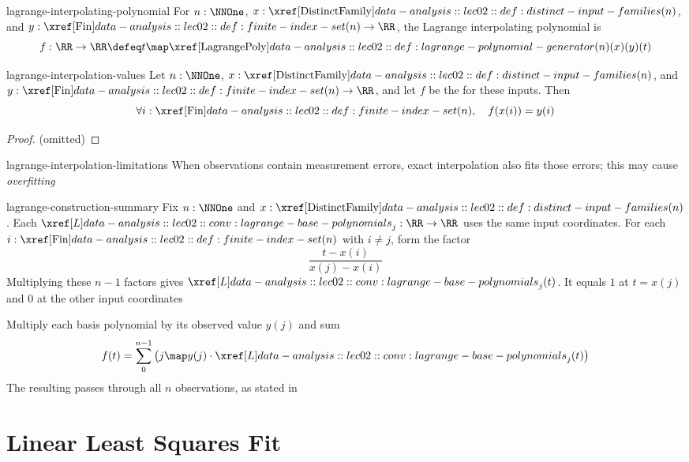 \documentclass[12pt]{article}
\numberwithin{figure}{section}
\begin{document}
\begin{dfn}{lagrange-interpolating-polynomial}
    For $n:\NNOne$, $x:\DistinctFamily(n)$, and
    $y:\Fin(n)\to\RR$, the Lagrange interpolating polynomial is
    \[
      f:\RR\to\RR\defeq t\map
      \LagrangePoly(n)(x)(y)(t) 
    \]
\end{dfn}

\begin{thm}{lagrange-interpolation-values}
    Let $n:\NNOne$, $x:\DistinctFamily(n)$, and
    $y:\Fin(n)\to\RR$, and let $f$ be the
    for these inputs. Then
    \[
      \forall i:\Fin(n),\quad f(x(i))=y(i)
    \]
\end{thm}

\begin{proof}
    \todo (omitted)
\end{proof}

\begin{rem}{lagrange-interpolation-limitations}
    When observations contain measurement errors, exact interpolation
    also fits those errors; this may cause \emph{overfitting}
\end{rem}

\begin{rem}{lagrange-construction-summary}
    Fix $n:\NNOne$ and $x:\DistinctFamily(n)$. Each
    $\LagrangeFamily_j:\RR\to\RR$ uses the same input coordinates.
    For each $i:\Fin(n)$ with $i\ne j$, form the factor
    \[
      \frac{t-x(i)}{x(j)-x(i)}
    \]
    Multiplying these $n-1$ factors gives $\LagrangeFamily_j(t)$.
    It equals $1$ at $t=x(j)$ and $0$ at the other input coordinates

    Multiply each basis polynomial by its observed value $y(j)$ and sum
    \[
      f(t)=\sum_0^{n-1}\left(j\map y(j)\cdot\LagrangeFamily_j(t)\right)
    \]
    The resulting 
    passes through all $n$ observations, as stated in
\end{rem}

\section{Linear Least Squares Fit}
\end{document}
